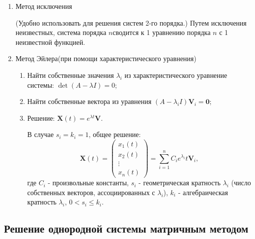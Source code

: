\documentclass[a5paper,10pt]{article}
\begin{document}
			\begin{enumerate}
				\item Метод исключения \par
				(Удобно использовать для решения систем 2-го порядка.) Путем исключения неизвестных, система порядка $n$сводится к 1 уравнению порядка $n$ с 1 неизвестной функцией.

				\item Метод Эйлера(при помощи характеристического уравнения) \par
				\begin{enumerate}
					\item Найти собственные значения $ \lambda_i $ из характеристического уравнение системы: $ \det \left( {A - \lambda I} \right) = 0 $;
					
					\item Найти собственные вектора из уравнения $ \left( {A - {\lambda _i}I} \right){\mathbf{V}_i} = \mathbf{0} $;

					\item Решение: $ \mathbf{X}(t) = e^{\lambda t}\mathbf{V} $.
					\begin{framed}
						В случае $s_i = k_i = 1$, общее решение: 
						\begin{equation}
							\mathbf{X}(t) = \left(
								\begin{array}{*{20}{c}}
									{{x_1}\left( t \right)}\\
									{{x_2}\left( t \right)}\\
									 \vdots \\
									{{x_n}\left( t \right)}
								\end{array}
							\right)
							= \sum\limits_{i=1}^n C_ie^{\lambda_i}t\mathbf{V}_i,
						\end{equation}
						где $ C_i $ - произвольные константы, $s_i$ - геометрическая кратность $\lambda_i$ (число собственных векторов, ассоциированных с $\lambda_i$), $k_i$ - алгебраическая кратность $\lambda_i$, $ 0 < s_i \leq k_i $.
					\end{framed}
				\end{enumerate}
			\end{enumerate}

		\subsection{Решение однородной системы матричным методом}
\end{document}

